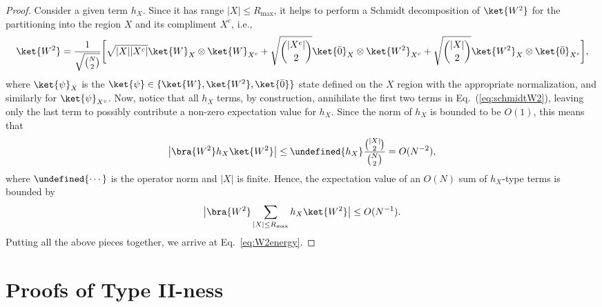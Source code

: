 \documentclass[prx,letterpaper,aps,superscriptaddress,floatfix,twocolumn,nofootinbib]{revtex4-2}
\let\norm\undefined
\DeclarePairedDelimiter\norm{\lVert}{\rVert}
\theoremstyle{definition}
\begin{document}
\begin{proof}
    Consider a given term $h_X$.
    Since it has range $|X|\leq R_{\text{max}}$, it helps to perform a Schmidt decomposition of $\ket{W^2}$ for the partitioning into the region $X$ and its compliment $X^c$, i.e.,
    \begin{equation}
    \label{eq:schmidtW2}
    \ket{W^2}=\frac{1}{\sqrt{\binom{N}{2}}}\bigg[\sqrt{|X||X^c|}\ket{W}_X\otimes \ket{W}_{X^c} %
    + \sqrt{\binom{|X^c|}{2}}\ket{\bar{0}}_X\otimes\ket{W^2}_{X^c}+\sqrt{\binom{|X|}{2}}\ket{W^2}_X\otimes \ket{\bar{0}}_{X^c}\bigg],
    \end{equation}
    where $\ket{\psi}_{X}$ is the $\ket{\psi}\in\{\ket{W},\ket{W^2},\ket{\bar{0}}\}$ state defined on the $X$ region with the appropriate normalization, and similarly for $\ket{\psi}_{X^c}$. 
    Now, notice that all $h_X$ terms, by construction, annihilate the first two terms in Eq.~(\ref{eq:schmidtW2}), leaving only the last term to possibly contribute a non-zero expectation value for $h_X$.
    Since the norm of $h_X$ is bounded to be $O(1)$, this means that
    \begin{equation}
    \left| \bra{W^2}h_X\ket{W^2} \right| \leq \norm{h_X}\frac{\binom{|X|}{2}}{\binom{N}{2}}=O(N^{-2}),
    \end{equation}
    where $\norm{\cdots}$ is the operator norm and $|X|$ is finite.
    Hence, the expectation value of an $O(N)$ sum of $h_X$-type terms is bounded by
    \begin{equation}
    \big| \bra{W^2}\sum_{|X|  \leq R_{\text{max}}} h_X\ket{W^2} \big| \leq O(N^{-1}).
    \end{equation}
    Putting all the above pieces together, we arrive at Eq.~\eqref{eq:W2energy}.
\end{proof}

\section{Proofs of Type II-ness}\label{app:typeIIness}
%
\end{document}
